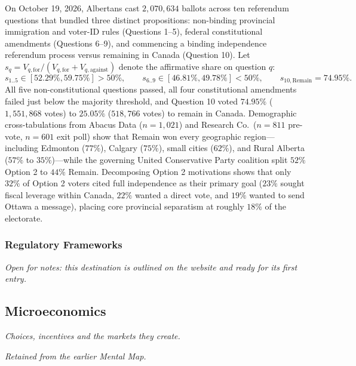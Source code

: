 \documentclass{article}
\newcounter{subsubsubsection}[subsubsection]
\begin{document}
On October 19, 2026, Albertans cast $2{,}070{,}634$ ballots across ten referendum questions that bundled three distinct propositions: non-binding provincial immigration and voter-ID rules (Questions 1--5), federal constitutional amendments (Questions 6--9), and commencing a binding independence referendum process versus remaining in Canada (Question 10). Let $s_q = V_{q,\text{for}} / (V_{q,\text{for}} + V_{q,\text{against}})$ denote the affirmative share on question $q$:
\begin{equation}
s_{1..5} \in [52.29\%, 59.75\%] > 50\%, \qquad
s_{6..9} \in [46.81\%, 49.78\%] < 50\%, \qquad
s_{10,\text{Remain}} = 74.95\%.
\label{eq:mm-alberta-blocks}
\end{equation}
All five non-constitutional questions passed, all four constitutional amendments failed just below the majority threshold, and Question 10 voted $74.95\%$ ($1{,}551{,}868$ votes) to $25.05\%$ ($518{,}766$ votes) to remain in Canada. Demographic cross-tabulations from Abacus Data ($n=1{,}021$) and Research Co.\ ($n=811$ pre-vote, $n=601$ exit poll) show that Remain won every geographic region---including Edmonton ($77\%$), Calgary ($75\%$), small cities ($62\%$), and Rural Alberta ($57\%$ to $35\%$)---while the governing United Conservative Party coalition split $52\%$ Option 2 to $44\%$ Remain. Decomposing Option 2 motivations shows that only $32\%$ of Option 2 voters cited full independence as their primary goal ($23\%$ sought fiscal leverage within Canada, $22\%$ wanted a direct vote, and $19\%$ wanted to send Ottawa a message), placing core provincial separatism at roughly $18\%$ of the electorate.

\subsubsection{Regulatory Frameworks}\label{sec:regulatory-frameworks}
\textit{Open for notes: this destination is outlined on the website and ready for its first entry.}

\subsection{Microeconomics}\label{sec:microeconomics}
\textit{Choices, incentives and the markets they create.}

\textit{Retained from the earlier Mental Map.}
\end{document}
